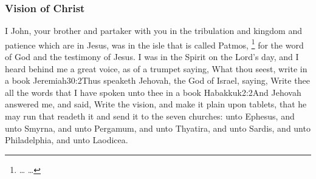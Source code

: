 \subsubsection*{Vision of Christ}

I John, your brother and partaker with you in the tribulation and kingdom and patience which are in Jesus, was in the isle that is called Patmos,%
	\footnote{\ldots%
			\ldots%
			}%
for the word of God and the testimony of Jesus. %
I was in the Spirit on the Lord’s day, and I heard behind me a great voice, as of a trumpet %
saying, What thou seest, write in a book%
%
				{Jeremiah}{30:2}{Thus speaketh Jehovah, the God of Israel, saying, Write thee all the words that I have spoken unto thee in a book}%
				{Habakkuk}{2:2}{And Jehovah answered me, and said, Write the vision, and make it plain upon tablets, that he may run that readeth it}%
and send it to the seven churches: unto Ephesus, and unto Smyrna, and unto Pergamum, and unto Thyatira, and unto Sardis, and unto Philadelphia, and unto Laodicea.

